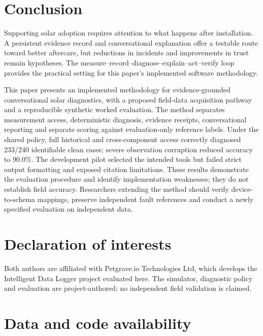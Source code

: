 \documentclass[11pt,a4paper]{article}
\begin{document}
\FloatBarrier
\section{Conclusion}

Supporting solar adoption requires attention to what happens after installation. A persistent evidence record and conversational explanation offer a testable route toward better aftercare, but reductions in incidents and improvements in trust remain hypotheses. The measure--record--diagnose--explain--act--verify loop provides the practical setting for this paper's implemented software methodology.


This paper presents an implemented methodology for evidence-grounded conversational solar diagnostics, with a proposed field-data acquisition pathway and a reproducible synthetic worked evaluation. The method separates measurement access, deterministic diagnosis, evidence receipts, conversational reporting and separate scoring against evaluation-only reference labels. Under the shared policy, full historical and cross-component access correctly diagnosed 233/240 identifiable clean cases; severe observation corruption reduced accuracy to 90.0\%. The development pilot selected the intended tools but failed strict output formatting and exposed citation limitations. These results demonstrate the evaluation procedure and identify implementation weaknesses; they do not establish field accuracy. Researchers extending the method should verify device-to-schema mappings, preserve independent fault references and conduct a newly specified evaluation on independent data.


\FloatBarrier
\section{Declaration of interests}

Both authors are affiliated with Petgrave.io Technologies Ltd, which develops the Intelligent Data Logger project evaluated here. The simulator, diagnostic policy and evaluation are project-authored; no independent field validation is claimed.


\FloatBarrier
\section{Data and code availability}
\end{document}
